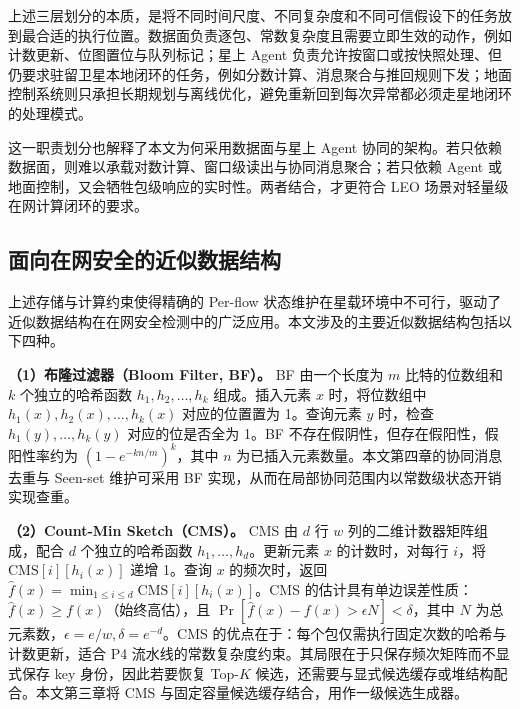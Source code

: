 上述三层划分的本质，是将不同时间尺度、不同复杂度和不同可信假设下的任务放到最合适的执行位置。数据面负责逐包、常数复杂度且需要立即生效的动作，例如计数更新、位图置位与队列标记；星上 Agent 负责允许按窗口或按快照处理、但仍要求驻留卫星本地闭环的任务，例如分数计算、消息聚合与推回规则下发；地面控制系统则只承担长期规划与离线优化，避免重新回到每次异常都必须走星地闭环的处理模式。

这一职责划分也解释了本文为何采用数据面与星上 Agent 协同的架构。若只依赖数据面，则难以承载对数计算、窗口级读出与协同消息聚合；若只依赖 Agent 或地面控制，又会牺牲包级响应的实时性。两者结合，才更符合 LEO 场景对轻量级在网计算闭环的要求。


\subsection{面向在网安全的近似数据结构}

上述存储与计算约束使得精确的 Per-flow 状态维护在星载环境中不可行，驱动了近似数据结构在在网安全检测中的广泛应用。本文涉及的主要近似数据结构包括以下四种。

\textbf{（1）布隆过滤器（Bloom Filter, BF）。} BF 由一个长度为 $m$ 比特的位数组和 $k$ 个独立的哈希函数 $h_1, h_2, \ldots, h_k$ 组成。插入元素 $x$ 时，将位数组中 $h_1(x), h_2(x), \ldots, h_k(x)$ 对应的位置置为 1。查询元素 $y$ 时，检查 $h_1(y), \ldots, h_k(y)$ 对应的位是否全为 1。BF 不存在假阴性，但存在假阳性，假阳性率约为 $(1-e^{-kn/m})^k$，其中 $n$ 为已插入元素数量。本文第四章的协同消息去重与 Seen-set 维护可采用 BF 实现，从而在局部协同范围内以常数级状态开销实现查重。

\textbf{（2）Count-Min Sketch（CMS）。} CMS 由 $d$ 行 $w$ 列的二维计数器矩阵组成，配合 $d$ 个独立的哈希函数 $h_1, \ldots, h_d$。更新元素 $x$ 的计数时，对每行 $i$，将 $\text{CMS}[i][h_i(x)]$ 递增 1。查询 $x$ 的频次时，返回 $\hat{f}(x) = \min_{1 \leq i \leq d} \text{CMS}[i][h_i(x)]$。CMS 的估计具有单边误差性质：$\hat{f}(x) \geq f(x)$（始终高估），且 $\Pr[\hat{f}(x) - f(x) > \epsilon N] < \delta$，其中 $N$ 为总元素数，$\epsilon = e/w, \delta = e^{-d}$。CMS 的优点在于：每个包仅需执行固定次数的哈希与计数更新，适合 P4 流水线的常数复杂度约束。其局限在于只保存频次矩阵而不显式保存 key 身份，因此若要恢复 Top-$K$ 候选，还需要与显式候选缓存或堆结构配合。本文第三章将 CMS 与固定容量候选缓存结合，用作一级候选生成器。


